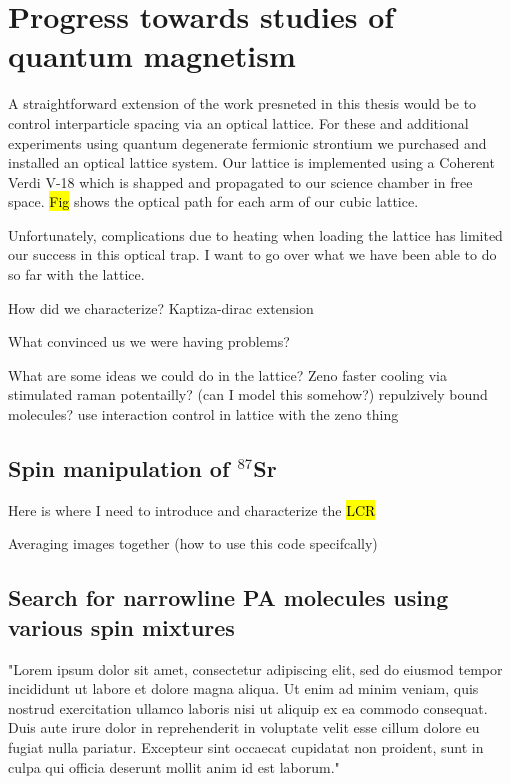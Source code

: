 \chapter{Progress towards studies of quantum magnetism}
\label{ch:chap6}

A straightforward extension of the work presneted in this thesis would be to control interparticle spacing via an optical lattice. For these and additional experiments using quantum degenerate fermionic strontium we purchased and installed an optical lattice system. Our lattice is implemented using a Coherent Verdi V-18 which is shapped and propagated to our science chamber in free space. \hl{Fig} shows the optical path for each arm of our cubic lattice. 

Unfortunately, complications due to heating when loading the lattice has limited our success in this optical trap. I want to go over what we have been able to do so far with the lattice.

How did we characterize?
	Kaptiza-dirac extension
	
What convinced us we were having problems?

What are some ideas we could do in the lattice?
	Zeno
	faster cooling via stimulated raman potentailly? (can I model this somehow?)
	repulzively bound molecules?
	use interaction control in lattice with the zeno thing
	

\section{Spin manipulation of $^{87}$Sr}
\label{sec:spin_pol}

Here is where I need to introduce and characterize the \hl{LCR}

Averaging images together (how to use this code specifcally)

\section{Search for narrowline PA molecules using various spin mixtures}
\label{sec:87PAS}

"Lorem ipsum dolor sit amet, consectetur adipiscing elit, sed do eiusmod tempor incididunt ut labore et dolore magna aliqua. Ut enim ad minim veniam, quis nostrud exercitation ullamco laboris nisi ut aliquip ex ea commodo consequat. Duis aute irure dolor in reprehenderit in voluptate velit esse cillum dolore eu fugiat nulla pariatur. Excepteur sint occaecat cupidatat non proident, sunt in culpa qui officia deserunt mollit anim id est laborum."